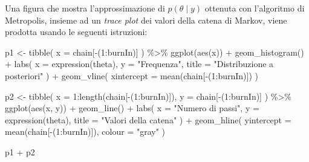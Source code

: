 \documentclass[
]{memoir}
\newenvironment{Shaded}{\begin{snugshade}}{\end{snugshade}}
\newcommand{\AttributeTok}[1]{\textcolor[rgb]{0.77,0.63,0.00}{#1}}
\newcommand{\DecValTok}[1]{\textcolor[rgb]{0.00,0.00,0.81}{#1}}
\newcommand{\FunctionTok}[1]{\textcolor[rgb]{0.00,0.00,0.00}{#1}}
\newcommand{\NormalTok}[1]{#1}
\newcommand{\OtherTok}[1]{\textcolor[rgb]{0.56,0.35,0.01}{#1}}
\newcommand{\SpecialCharTok}[1]{\textcolor[rgb]{0.00,0.00,0.00}{#1}}
\newcommand{\StringTok}[1]{\textcolor[rgb]{0.31,0.60,0.02}{#1}}
\begin{document}
Una figura che mostra l'approssimazione di \(p(\theta \mid y)\) ottenuta con l'algoritmo di Metropolis, insieme ad un \emph{trace plot} dei valori della catena di Markov, viene prodotta usando le seguenti istruzioni:

\begin{Shaded}
\begin{Highlighting}[]
\NormalTok{p1 }\OtherTok{\textless{}{-}} \FunctionTok{tibble}\NormalTok{(}
  \AttributeTok{x =}\NormalTok{ chain[}\SpecialCharTok{{-}}\NormalTok{(}\DecValTok{1}\SpecialCharTok{:}\NormalTok{burnIn)]}
\NormalTok{  ) }\SpecialCharTok{\%\textgreater{}\%}
  \FunctionTok{ggplot}\NormalTok{(}\FunctionTok{aes}\NormalTok{(x)) }\SpecialCharTok{+}
  \FunctionTok{geom\_histogram}\NormalTok{() }\SpecialCharTok{+}
  \FunctionTok{labs}\NormalTok{(}
    \AttributeTok{x =} \FunctionTok{expression}\NormalTok{(theta),}
    \AttributeTok{y =} \StringTok{"Frequenza"}\NormalTok{,}
    \AttributeTok{title =} \StringTok{"Distribuzione a posteriori"}
\NormalTok{  ) }\SpecialCharTok{+}
  \FunctionTok{geom\_vline}\NormalTok{(}
    \AttributeTok{xintercept =} \FunctionTok{mean}\NormalTok{(chain[}\SpecialCharTok{{-}}\NormalTok{(}\DecValTok{1}\SpecialCharTok{:}\NormalTok{burnIn)])}
\NormalTok{  )}

\NormalTok{p2 }\OtherTok{\textless{}{-}} \FunctionTok{tibble}\NormalTok{(}
  \AttributeTok{x =} \DecValTok{1}\SpecialCharTok{:}\FunctionTok{length}\NormalTok{(chain[}\SpecialCharTok{{-}}\NormalTok{(}\DecValTok{1}\SpecialCharTok{:}\NormalTok{burnIn)]),}
  \AttributeTok{y =}\NormalTok{ chain[}\SpecialCharTok{{-}}\NormalTok{(}\DecValTok{1}\SpecialCharTok{:}\NormalTok{burnIn)]}
\NormalTok{  ) }\SpecialCharTok{\%\textgreater{}\%}
  \FunctionTok{ggplot}\NormalTok{(}\FunctionTok{aes}\NormalTok{(x, y)) }\SpecialCharTok{+}
  \FunctionTok{geom\_line}\NormalTok{() }\SpecialCharTok{+}
  \FunctionTok{labs}\NormalTok{(}
    \AttributeTok{x =} \StringTok{"Numero di passi"}\NormalTok{,}
    \AttributeTok{y =} \FunctionTok{expression}\NormalTok{(theta),}
    \AttributeTok{title =} \StringTok{"Valori della catena"}
\NormalTok{  ) }\SpecialCharTok{+}
  \FunctionTok{geom\_hline}\NormalTok{(}
    \AttributeTok{yintercept =} \FunctionTok{mean}\NormalTok{(chain[}\SpecialCharTok{{-}}\NormalTok{(}\DecValTok{1}\SpecialCharTok{:}\NormalTok{burnIn)]),}
    \AttributeTok{colour =} \StringTok{"gray"}
\NormalTok{  )}

\NormalTok{p1 }\SpecialCharTok{+}\NormalTok{ p2}
\end{Highlighting}
\end{Shaded}
\end{document}
